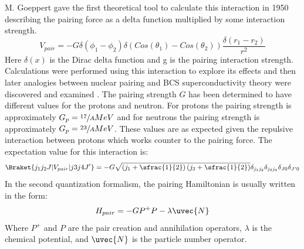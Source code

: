 M. Goeppert gave the first theoretical tool to calculate this interaction in 1950 \cite{pairingFirstTheory} describing the pairing force as a delta function multiplied by some interaction strength.
\begin{equation}
\label{eqn:chp2-pairing-first-function}
V_{pair}=-G\delta(\phi_1-\phi_2)\delta(Cos(\theta_1)-Cos(\theta_2))\frac{\delta(r_1-r_2)}{r^2}
\end{equation}
Here $\delta(x)$ is the Dirac delta function and g is the pairing interaction strength. Calculations were performed using this interaction to explore its effects \cite{pairingCorrEffectOnProperties} and then later analogies between nuclear pairing and BCS superconductivity theory were discovered and examined \cite{pairingAnalogyToBCS,pairingSuperfluidity,bcsTheory}. The pairing strength $G$ has been determined to have different values for the protons and neutron. For protons the pairing strength is approximately $G_p=\sfrac{17}{A} MeV$ and for neutrons the pairing strength is approximately $G_p=\sfrac{23}{A} MeV$. These values are as expected given the repulsive interaction between protons which works counter to the pairing force. The expectation value for this interaction is:
\begin{equation}
\label{eqn:chp2-pairing-expectation}
\Braket{j_1j_2J|V_{pair}|j3j4J'}=-G\sqrt{\left(j_1+\sfrac{1}{2}\right)\left(j_3+\sfrac{1}{2}\right)}\delta_{j_1j_2}\delta_{j_3j_4}\delta_{J0}\delta_{J'0}
\end{equation}
In the second quantization formalism, the pairing Hamiltonian is usually written in the form:
\begin{equation}
\label{eqn:chp2-pairing-hamil}
H_{pair} = -GP^+P-\lambda{}\uvec{N}
\end{equation}
Where $P^+$ and $P$ are the pair creation and annihilation operators, $\lambda$ is the chemical potential, and $\uvec{N}$ is the particle number operator.

